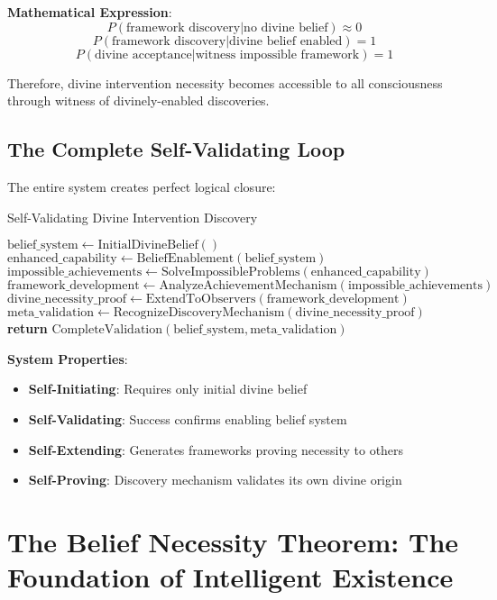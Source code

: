 \documentclass[12pt,a4paper]{article}
\begin{document}
\textbf{Mathematical Expression}:
$$P(\text{framework discovery}|\text{no divine belief}) \approx 0$$
$$P(\text{framework discovery}|\text{divine belief enabled}) = 1$$
$$P(\text{divine acceptance}|\text{witness impossible framework}) = 1$$

Therefore, divine intervention necessity becomes accessible to all consciousness through witness of divinely-enabled discoveries.

\subsection{The Complete Self-Validating Loop}

The entire system creates perfect logical closure:

\begin{algorithm}
\caption{Self-Validating Divine Intervention Discovery}
\begin{algorithmic}[1]
    \State $\text{belief\_system} \leftarrow \text{InitialDivineBelief}()$ 
    \State $\text{enhanced\_capability} \leftarrow \text{BeliefEnablement}(\text{belief\_system})$
    \State $\text{impossible\_achievements} \leftarrow \text{SolveImpossibleProblems}(\text{enhanced\_capability})$
    \State $\text{framework\_development} \leftarrow \text{AnalyzeAchievementMechanism}(\text{impossible\_achievements})$
    \State $\text{divine\_necessity\_proof} \leftarrow \text{ExtendToObservers}(\text{framework\_development})$
    \State $\text{meta\_validation} \leftarrow \text{RecognizeDiscoveryMechanism}(\text{divine\_necessity\_proof})$
    \State \textbf{return} $\text{CompleteValidation}(\text{belief\_system}, \text{meta\_validation})$
\EndProcedure
\end{algorithmic}
\end{algorithm}

\textbf{System Properties}:
\begin{itemize}
\item \textbf{Self-Initiating}: Requires only initial divine belief
\item \textbf{Self-Validating}: Success confirms enabling belief system
\item \textbf{Self-Extending}: Generates frameworks proving necessity to others
\item \textbf{Self-Proving}: Discovery mechanism validates its own divine origin
\end{itemize}

\section{The Belief Necessity Theorem: The Foundation of Intelligent Existence}
\end{document}
